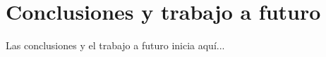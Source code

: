 
\chapter{Conclusiones y trabajo a futuro}

Las conclusiones y el trabajo a futuro inicia aqu\'i...

\clearpage